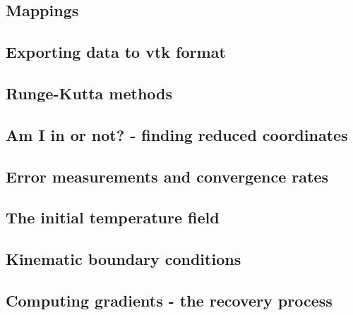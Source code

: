 \documentclass[a4paper]{article}
\begin{document}
\subsection{Mappings}  %
\newpage %
\subsection{Exporting data to vtk format}  %
\newpage %
\subsection{Runge-Kutta methods}  %
\newpage %
\subsection{Am I in or not? - finding reduced coordinates}\label{sec:amiin} %
\newpage %
\subsection{Error measurements and convergence rates}  %
\newpage %
\subsection{The initial temperature field}  %
\newpage %
\subsection{Kinematic boundary conditions}  %
\newpage %
\subsection{Computing gradients - the recovery process}  %
\newpage %
\end{document}
